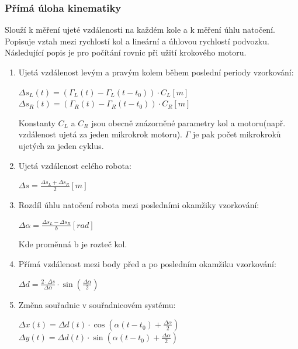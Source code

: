 \subsubsection{Přímá úloha kinematiky}
Slouží k měření ujeté vzdálenosti na každém kole a k měření úhlu natočení.\\
Popisuje vztah mezi rychlostí kol a lineární a úhlovou rychlostí podvozku.\\
Následující popis je pro počítání rovnic při užití krokového motoru.\\
\begin{enumerate}
    \item Ujetá vzdálenost levým a pravým kolem během poslední periody vzorkování:
          \begin{center}
              \(\Delta s_L(t) = (\Gamma_L(t)-\Gamma_L(t-t_0))\cdot C_L [m]\)\\
              \(\Delta s_R(t) = (\Gamma_R(t)-\Gamma_R(t-t_0))\cdot C_R [m]\)
          \end{center}
          Konstanty \(C_L\) a \(C_R\) jsou obecně znázorněné parametry kol a motoru(např. vzdálenost ujetá za jeden mikrokrok motoru). \(\Gamma \) je pak počet mikrokroků ujetých za jeden cyklus.
    \item Ujetá vzdálenost celého robota:
          \begin{center}
              \(\Delta s =  \frac{\Delta s_L + \Delta s_R}{2}[m]\)
          \end{center}
    \item Rozdíl úhlu natočení robota mezi posledními okamžiky vzorkování:
          \begin{center}
              \(\Delta \alpha = \frac{\Delta s_L - \Delta s_R}{b}[rad]\)
          \end{center}
          Kde proměnná b je rozteč kol.
    \item Přímá vzdálenost mezi body před a po posledním okamžiku vzorkování:
          \begin{center}
              \(\Delta d = \frac{2\cdot \Delta s}{\Delta \alpha} \cdot \sin(\frac{\Delta \alpha}{2})\)
          \end{center}
    \item Změna souřadnic v souřadnicovém systému:
          \begin{center}
              \(\Delta x(t) = \Delta d(t)\cdot\cos(\alpha(t-t_0)+\frac{\Delta \alpha}{2})\)\\
              \(\Delta y(t) = \Delta d(t)\cdot\sin(\alpha(t-t_0)+\frac{\Delta \alpha}{2})\)\\

\end{center}
\end{enumerate}
